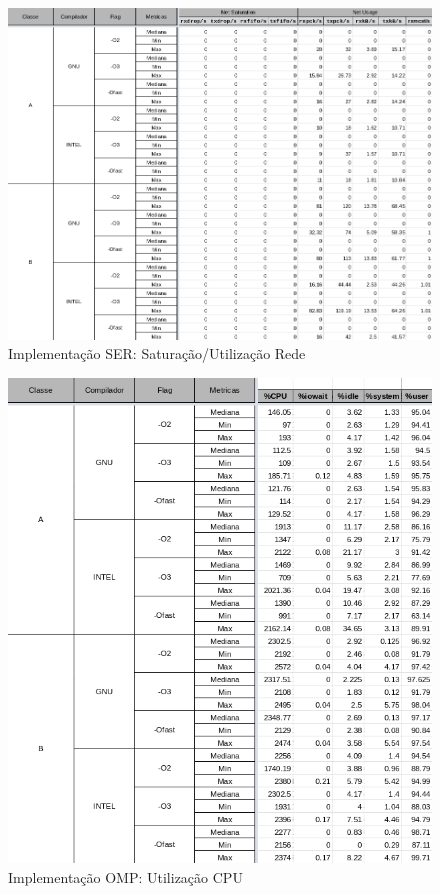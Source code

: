 \documentclass{article}
\begin{document}
\begin{appendices}
\begin{figure}[H]
    \centering
    \includegraphics[width=12cm]{Pictures/FT_r431_SER_NET.png}
    \caption{Implementação SER: Saturação/Utilização Rede}
    \label{figure:FT_r431_SER_NT}
\end{figure}



\begin{figure}[H]
    \centering
    \includegraphics[width=12cm]{Pictures/FT_r431_OMP_CPU.png}
    \caption{Implementação OMP: Utilização CPU}
    \label{figure:FT_r431_OMP_CPU}
\end{figure}


\end{appendices}
\end{document}
